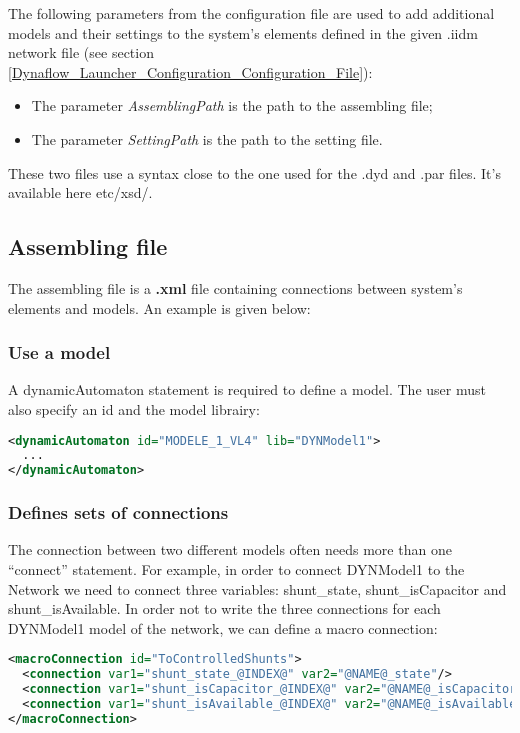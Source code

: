 \documentclass[a4paper, 12pt]{report}
\begin{document}
The following parameters from the configuration file are used to add additional models and their settings to the system's elements defined in the given .iidm network file (see section \ref{Dynaflow_Launcher_Configuration_Configuration_File}):
\begin{itemize}
  \item The parameter \textit{AssemblingPath} is the path to the assembling file;
  \item The parameter \textit{SettingPath} is the path to the setting file.
\end{itemize}

These two files use a syntax close to the one used for the .dyd and .par files. It's available here etc/xsd/.

\subsection{Assembling file}

The assembling file is a \textbf{.xml} file containing connections between system's elements and models. An example is given below:



\subsubsection{Use a model}

A dynamicAutomaton statement is required to define a model. The user must also specify an id and the model librairy:

\begin{lstlisting}[language=XML, morekeywords={dynamicAutomaton}]
<dynamicAutomaton id="MODELE_1_VL4" lib="DYNModel1">
  ...
</dynamicAutomaton>
\end{lstlisting}

\subsubsection{Defines sets of connections}

The connection between two different models often needs more than one ``connect'' statement. For example, in order to connect DYNModel1 to the Network we need to connect three variables: shunt\_state, shunt\_isCapacitor and shunt\_isAvailable.
In order not to write the three connections for each DYNModel1 model of the network, we can define a macro connection:
\begin{lstlisting}[language=XML, morekeywords={macroConnection}]
<macroConnection id="ToControlledShunts">
  <connection var1="shunt_state_@INDEX@" var2="@NAME@_state"/>
  <connection var1="shunt_isCapacitor_@INDEX@" var2="@NAME@_isCapacitor"/>
  <connection var1="shunt_isAvailable_@INDEX@" var2="@NAME@_isAvailable"/>
</macroConnection>
\end{lstlisting}
\end{document}
